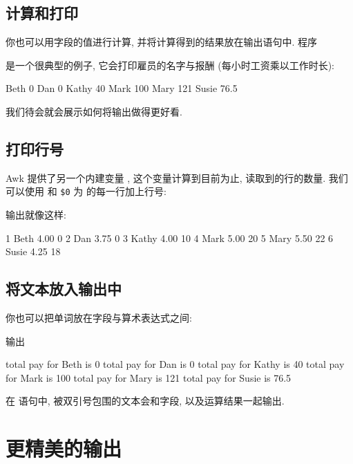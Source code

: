 \subsection{计算和打印}
\label{subsec:computing_and_printing}

你也可以用字段的值进行计算, 并将计算得到的结果放在输出语句中. 程序
是一个很典型的例子, 它会打印雇员的名字与报酬 (每小时工资乘以工作时长):
\begin{myverb}
    Beth 0
    Dan 0
    Kathy 40
    Mark 100
    Mary 121
    Susie 76.5
\end{myverb}
我们待会就会展示如何将输出做得更好看.

\subsection{打印行号}
\label{subsec:printing_line_numbers}

Awk 提供了另一个内建变量 \nr, 这个变量计算到目前为止, 读取到的行的数量.
我们可以使用 \nr 和 \verb'$0' 为  的每一行加上行号:
输出就像这样:
\begin{myverb}
    1 Beth    4.00    0
    2 Dan     3.75    0
    3 Kathy   4.00    10
    4 Mark    5.00    20
    5 Mary    5.50    22
    6 Susie   4.25    18
\end{myverb}

\subsection{将文本放入输出中}
\label{subsec:putting_text_in_the_output}

你也可以把单词放在字段与算术表达式之间:
输出
\begin{myverb}
    total pay for Beth is 0
    total pay for Dan is 0
    total pay for Kathy is 40
    total pay for Mark is 100
    total pay for Mary is 121
    total pay for Susie is 76.5
\end{myverb}
在 \print 语句中, 被双引号包围的文本会和字段, 以及运算结果一起输出.

\section{更精美的输出}
\label{sec:fancier_output}

